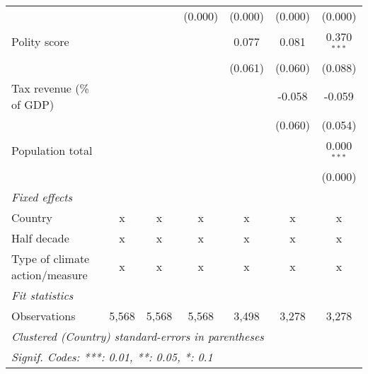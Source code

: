 \begin{tabular}{lcccccc}
                                                                               &              &              & (0.000)       & (0.000)       & (0.000)       & (0.000)\\   
   Polity score                                                                &              &              &               & 0.077         & 0.081         & 0.370$^{***}$\\   
                                                                               &              &              &               & (0.061)       & (0.060)       & (0.088)\\   
   Tax revenue (\% of GDP)                                                     &              &              &               &               & -0.058        & -0.059\\   
                                                                               &              &              &               &               & (0.060)       & (0.054)\\   
   Population total                                                            &              &              &               &               &               & 0.000$^{***}$\\   
                                                                               &              &              &               &               &               & (0.000)\\   
   \emph{Fixed effects}\\
   Country                                                                     & x            & x            & x             & x             & x             & x\\  
   Half decade                                                                 & x            & x            & x             & x             & x             & x\\  
   Type of climate action/measure                                              & x            & x            & x             & x             & x             & x\\  
   \midrule \emph{Fit statistics}\\
   Observations                                                                & 5,568        & 5,568        & 5,568         & 3,498         & 3,278         & 3,278\\  
   \midrule
   \multicolumn{7}{l}{\emph{Clustered (Country) standard-errors in parentheses}}\\
   \multicolumn{7}{l}{\emph{Signif. Codes: ***: 0.01, **: 0.05, *: 0.1}}\\
\end{tabular}
\par\endgroup


